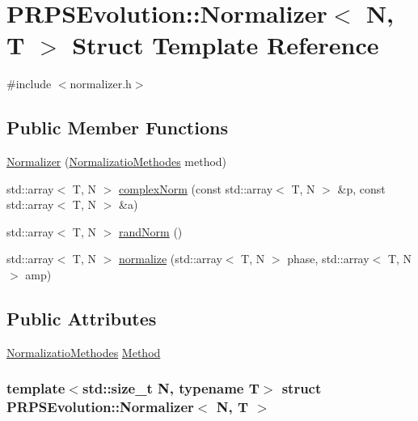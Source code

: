 \hypertarget{struct_p_r_p_s_evolution_1_1_normalizer}{\section{\-P\-R\-P\-S\-Evolution\-:\-:\-Normalizer$<$ \-N, \-T $>$ \-Struct \-Template \-Reference}
\label{struct_p_r_p_s_evolution_1_1_normalizer}
}


{\ttfamily \#include $<$normalizer.\-h$>$}

\subsection*{\-Public \-Member \-Functions}
\begin{DoxyCompactItemize}
\item 
\hyperlink{struct_p_r_p_s_evolution_1_1_normalizer_af8c736f39d1d48d095701c7b506afaef}{\-Normalizer} (\hyperlink{namespace_p_r_p_s_evolution_aa0fb2fb2ee1d0aefb8d28fadadbf241a}{\-Normalizatio\-Methodes} method)
\item 
std\-::array$<$ \-T, \-N $>$ \hyperlink{struct_p_r_p_s_evolution_1_1_normalizer_a89cc950cde6bbf41b71a0486c5b369a9}{complex\-Norm} (const std\-::array$<$ \-T, \-N $>$ \&p, const std\-::array$<$ \-T, \-N $>$ \&a)
\item 
std\-::array$<$ \-T, \-N $>$ \hyperlink{struct_p_r_p_s_evolution_1_1_normalizer_afdbc126fac8aaa9dc09515c57cda3e47}{rand\-Norm} ()
\item 
std\-::array$<$ \-T, \-N $>$ \hyperlink{struct_p_r_p_s_evolution_1_1_normalizer_a94f3435171f94f8969eeebcf8e80037d}{normalize} (std\-::array$<$ \-T, \-N $>$ phase, std\-::array$<$ \-T, \-N $>$ amp)
\end{DoxyCompactItemize}
\subsection*{\-Public \-Attributes}
\begin{DoxyCompactItemize}
\item 
\hyperlink{namespace_p_r_p_s_evolution_aa0fb2fb2ee1d0aefb8d28fadadbf241a}{\-Normalizatio\-Methodes} \hyperlink{struct_p_r_p_s_evolution_1_1_normalizer_a0319d39d11a258e51c5846a85e50097b}{\-Method}
\end{DoxyCompactItemize}
\subsubsection*{template$<$std\-::size\-\_\-t \-N, typename T$>$ struct P\-R\-P\-S\-Evolution\-::\-Normalizer$<$ N, T $>$}



